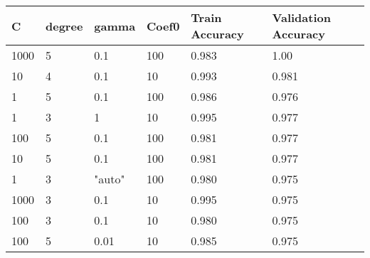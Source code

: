 \def\arraystretch{1.25}
\begin{center}
\begin{longtable}{l l l l l l}
\hline
\hline
\textbf{C} & \textbf{degree} & \textbf{gamma} & \textbf{Coef0} & \textbf{Train Accuracy} & \textbf{Validation Accuracy}\\
\hline
\hline
1000 & 5 & 0.1 & 100 & 0.983 & 1.00 \\
10 & 4 & 0.1 & 10 & 0.993 & 0.981 \\
1 & 5 & 0.1 & 100 & 0.986 & 0.976  \\
1 & 3 & 1 & 10 & 0.995 & 0.977 \\
100 & 5 & 0.1 & 100 & 0.981 & 0.977 \\
10 & 5 & 0.1 & 100 & 0.981 & 0.977 \\
1 & 3 & "auto" & 100 & 0.980 & 0.975 \\
1000 & 3 & 0.1 & 10 & 0.995 & 0.975 \\
100 & 3 & 0.1 & 10 & 0.980 & 0.975 \\
100 & 5 & 0.01 & 10 & 0.985 & 0.975 \\

\hline
\end{longtable}
\setcounter{table}{1}
\end{center}